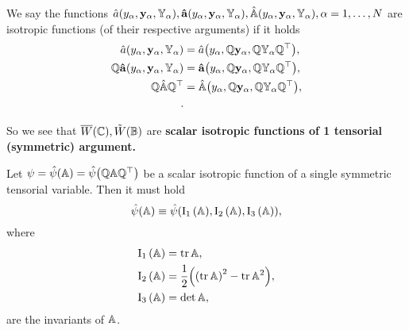 \documentclass[reqno, a4paper]{article}
\begin{document}
\begin{definition}
	We say the functions $\hat{a}\qty(y_{\alpha}, \vb{y}_{\alpha}, \mathbb{Y}_{\alpha}), \vb{\hat{a}}\qty(y_{\alpha}, \vb{y}_{\alpha}, \mathbb{Y}_{\alpha}), \hat{\mathbb{A}}\qty(y_{\alpha},\vb{y}_{\alpha},\mathbb{Y}_{\alpha}), \alpha = 1, \dots, N$ are isotropic functions (of their respective arguments) if it holds
	\begin{align*}
		\hat{a}\qty(y_{\alpha}, \vb{y}_{\alpha}, \mathbb{Y}_{\alpha}) &= \hat{a}\qty(y_{\alpha}, \mathbb{Q}\vb{y}_{\alpha}, \mathbb{Q} \mathbb{Y}_{\alpha} \mathbb{Q}^\top), \\
		\mathbb{Q} \vb{\hat{a}}\qty(y_{\alpha}, \vb{y}_{\alpha}, \mathbb{Y}_{\alpha}) &= \vb{\hat{a}}\qty(y_{\alpha}, \mathbb{Q}\vb{y}_{\alpha}, \mathbb{Q}\mathbb{Y}_{\alpha}\mathbb{Q}^\top), \\
		\mathbb{Q}\hat{\mathbb{A}} \mathbb{Q}^\top &= \hat{\mathbb{A}}\qty(y_{\alpha}, \mathbb{Q}\vb{y}_{\alpha}, \mathbb{Q}\mathbb{Y}_{\alpha}\mathbb{Q}^\top), \\.
	\end{align*}
\end{definition}
So we see that $\overline{W}\qty(\mathbb{C}), \tilde{W}\qty(\mathbb{B})$ are \textbf{scalar isotropic functions of 1 tensorial (symmetric) argument.}

\begin{theorem}
	Let $\psi = \hat{\psi}\qty(\mathbb{A}) = \hat{\psi}\qty(\mathbb{Q}\mathbb{A}\mathbb{Q}^\top)$ be a scalar isotropic function of a single symmetric tensorial variable. Then it must hold
	\[
		\hat{\psi}\qty(\mathbb{A}) \equiv \hat{\psi}\qty(\operatorname{I_1}\qty(\mathbb{A}),\operatorname{I_2}\qty(\mathbb{A}),\operatorname{I_3}\qty(\mathbb{A})),
	\]	
where
\begin{align*}
	\operatorname{I_1}\qty(\mathbb{A}) &= \tr \mathbb{A},\\
	\operatorname{I_2}\qty(\mathbb{A}) &= \frac{1}{2}\qty(\qty(\tr \mathbb{A})^{2}-\tr \mathbb{A}^{2}),\\
	\operatorname{I_3}\qty(\mathbb{A}) &= \det \mathbb{A},
\end{align*}
are the invariants of $\mathbb{A}$.
\end{theorem}
\end{document}

